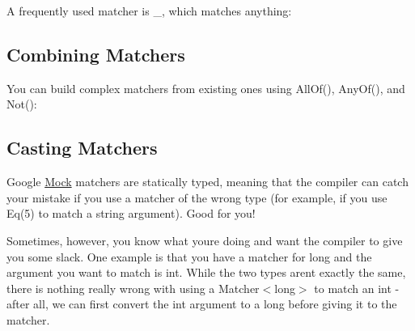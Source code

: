 A frequently used matcher is {\ttfamily \+\_\+}, which matches anything\+:


\begin{DoxyCode}{0}
\end{DoxyCode}


\subsection*{Combining Matchers}

You can build complex matchers from existing ones using {\ttfamily All\+Of()}, {\ttfamily Any\+Of()}, and {\ttfamily Not()}\+:


\begin{DoxyCode}{0}
\DoxyCodeLine{}
\end{DoxyCode}


\subsection*{Casting Matchers}

Google \mbox{\hyperlink{class_mock}{Mock}} matchers are statically typed, meaning that the compiler can catch your mistake if you use a matcher of the wrong type (for example, if you use {\ttfamily Eq(5)} to match a {\ttfamily string} argument). Good for you!

Sometimes, however, you know what you\textquotesingle{}re doing and want the compiler to give you some slack. One example is that you have a matcher for {\ttfamily long} and the argument you want to match is {\ttfamily int}. While the two types aren\textquotesingle{}t exactly the same, there is nothing really wrong with using a {\ttfamily Matcher$<$long$>$} to match an {\ttfamily int} -\/ after all, we can first convert the {\ttfamily int} argument to a {\ttfamily long} before giving it to the matcher.

